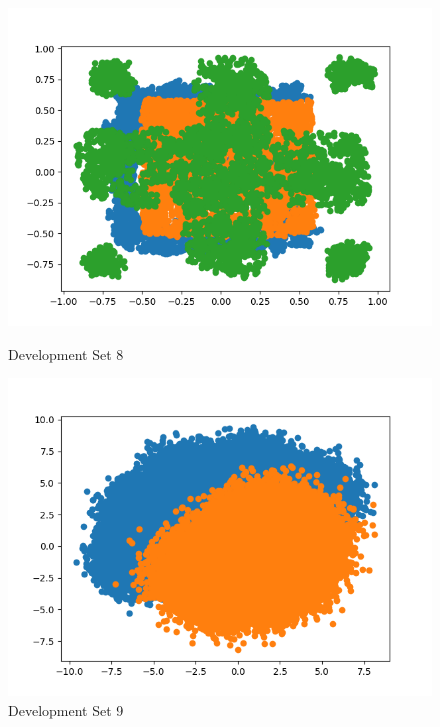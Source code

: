 \documentclass{article}
\begin{document}
\begin{figure}[H]
	\centering
	\begin{minipage}{.33\textwidth}
			\centering
			\includegraphics[width=1\linewidth]{../DevSet 08.png}
			\caption{Development Set 8}
	\end{minipage}\hfill
        \centering
	\begin{minipage}{.33\textwidth}
			\centering
			\includegraphics[width=1\linewidth]{../DevSet 09.png}
			\caption{Development Set 9}
	\end{minipage}\hfill
        \centering
	\begin{minipage}{.33\textwidth}
			\centering

\end{minipage}
\end{figure}
\end{document}
